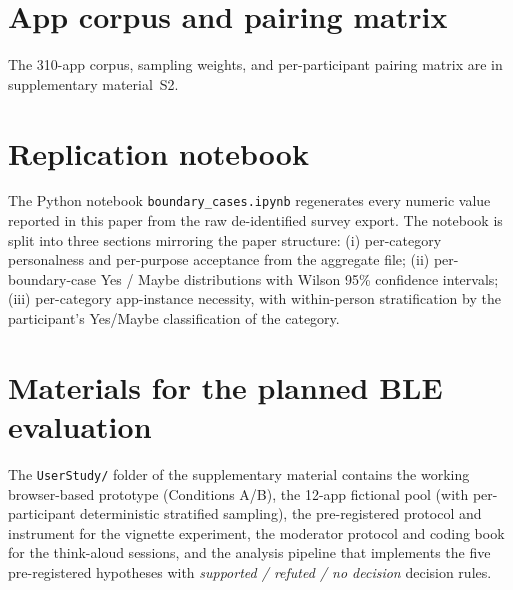 \documentclass[11pt,a4paper]{article}
\makeatletter
\let\@oldsection\section
\renewcommand{\section}{\FloatBarrier\@oldsection}
\makeatother
\begin{document}
\section{App corpus and pairing matrix}\label{app:corpus}
The 310-app corpus, sampling weights, and per-participant pairing
matrix are in supplementary material~S2.

\section{Replication notebook}\label{app:replication}
The Python notebook \texttt{boundary\_cases.ipynb} regenerates every
numeric value reported in this paper from the raw de-identified
survey export. The notebook is split into three sections mirroring
the paper structure: (i) per-category personalness and per-purpose
acceptance from the aggregate file; (ii) per-boundary-case Yes /
Maybe distributions with Wilson 95\% confidence intervals;
(iii) per-category app-instance necessity, with within-person
stratification by the participant's Yes/Maybe classification of the
category.

\section{Materials for the planned BLE evaluation}\label{app:eval}
The \texttt{UserStudy/} folder of the supplementary material contains
the working browser-based prototype (Conditions A/B), the
12-app fictional pool (with per-participant deterministic
stratified sampling), the pre-registered protocol and instrument
for the vignette experiment, the moderator protocol and coding book
for the think-aloud sessions, and the analysis pipeline that
implements the five pre-registered hypotheses with
\emph{supported / refuted / no decision} decision rules.
\end{document}
